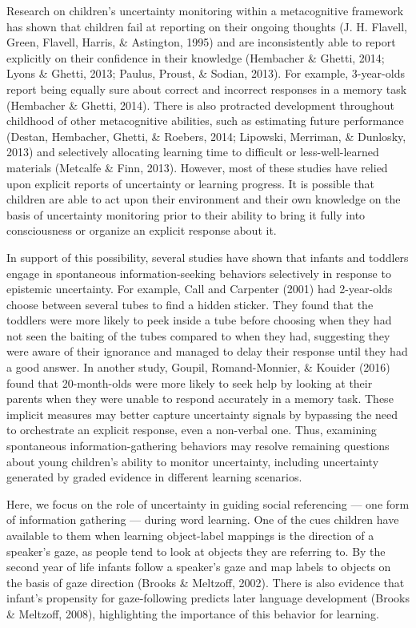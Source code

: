 \documentclass[10pt, letterpaper]{article}
\begin{document}
Research on children's uncertainty monitoring within a metacognitive
framework has shown that children fail at reporting on their ongoing
thoughts (J. H. Flavell, Green, Flavell, Harris, \& Astington, 1995) and
are inconsistently able to report explicitly on their confidence in
their knowledge (Hembacher \& Ghetti, 2014; Lyons \& Ghetti, 2013;
Paulus, Proust, \& Sodian, 2013). For example, 3-year-olds report being
equally sure about correct and incorrect responses in a memory task
(Hembacher \& Ghetti, 2014). There is also protracted development
throughout childhood of other metacognitive abilities, such as
estimating future performance (Destan, Hembacher, Ghetti, \& Roebers,
2014; Lipowski, Merriman, \& Dunlosky, 2013) and selectively allocating
learning time to difficult or less-well-learned materials (Metcalfe \&
Finn, 2013). However, most of these studies have relied upon explicit
reports of uncertainty or learning progress. It is possible that
children are able to act upon their environment and their own knowledge
on the basis of uncertainty monitoring prior to their ability to bring
it fully into consciousness or organize an explicit response about it.

In support of this possibility, several studies have shown that infants
and toddlers engage in spontaneous information-seeking behaviors
selectively in response to epistemic uncertainty. For example, Call and
Carpenter (2001) had 2-year-olds choose between several tubes to find a
hidden sticker. They found that the toddlers were more likely to peek
inside a tube before choosing when they had not seen the baiting of the
tubes compared to when they had, suggesting they were aware of their
ignorance and managed to delay their response until they had a good
answer. In another study, Goupil, Romand-Monnier, \& Kouider (2016)
found that 20-month-olds were more likely to seek help by looking at
their parents when they were unable to respond accurately in a memory
task. These implicit measures may better capture uncertainty signals by
bypassing the need to orchestrate an explicit response, even a
non-verbal one. Thus, examining spontaneous information-gathering
behaviors may resolve remaining questions about young children's ability
to monitor uncertainty, including uncertainty generated by graded
evidence in different learning scenarios.

Here, we focus on the role of uncertainty in guiding social referencing
--- one form of information gathering --- during word learning. One of
the cues children have available to them when learning object-label
mappings is the direction of a speaker's gaze, as people tend to look at
objects they are referring to. By the second year of life infants follow
a speaker's gaze and map labels to objects on the basis of gaze
direction (Brooks \& Meltzoff, 2002). There is also evidence that
infant's propensity for gaze-following predicts later language
development (Brooks \& Meltzoff, 2008), highlighting the importance of
this behavior for learning.
\end{document}

